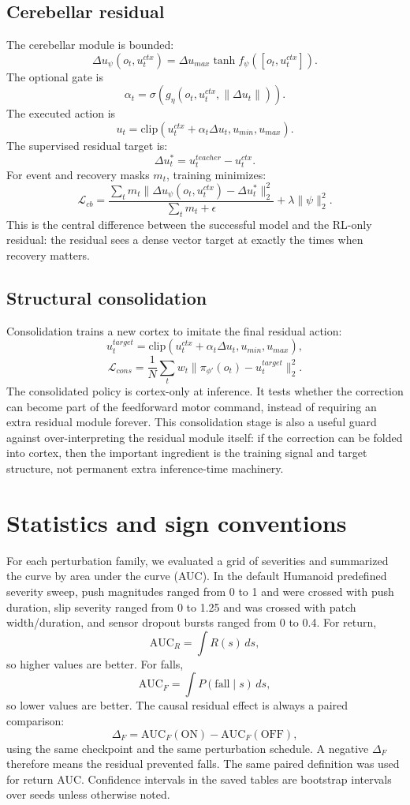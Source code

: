 \documentclass[11pt]{article}
\begin{document}
\subsection{Cerebellar residual}
The cerebellar module is bounded:
\[
\Delta u_\psi(o_t,u_t^{ctx}) =
\Delta u_{max} \tanh f_\psi([o_t,u_t^{ctx}]).
\]
The optional gate is
\[
\alpha_t = \sigma(g_\eta(o_t,u_t^{ctx},\|\Delta u_t\|)).
\]
The executed action is
\[
u_t = \mathrm{clip}(u_t^{ctx} + \alpha_t \Delta u_t, u_{min}, u_{max}).
\]
The supervised residual target is:
\[
\Delta u_t^* = u_t^{teacher} - u_t^{ctx}.
\]
For event and recovery masks $m_t$, training minimizes:
\[
\mathcal{L}_{cb} =
\frac{\sum_t m_t \|\Delta u_\psi(o_t,u_t^{ctx}) - \Delta u_t^*\|_2^2}
{\sum_t m_t + \epsilon} + \lambda \|\psi\|_2^2.
\]
This is the central difference between the successful model and the RL-only residual: the residual sees a dense vector target at exactly the times when recovery matters.

\subsection{Structural consolidation}
Consolidation trains a new cortex to imitate the final residual action:
\[
u_t^{target} = \mathrm{clip}(u_t^{ctx} + \alpha_t \Delta u_t, u_{min}, u_{max}),
\]
\[
\mathcal{L}_{cons} =
\frac{1}{N}\sum_t w_t \|\pi_{\phi'}(o_t) - u_t^{target}\|_2^2.
\]
The consolidated policy is cortex-only at inference.  It tests whether the correction can become part of the feedforward motor command, instead of requiring an extra residual module forever.  This consolidation stage is also a useful guard against over-interpreting the residual module itself: if the correction can be folded into cortex, then the important ingredient is the training signal and target structure, not permanent extra inference-time machinery.

\section{Statistics and sign conventions}
For each perturbation family, we evaluated a grid of severities and summarized the curve by area under the curve (AUC).  In the default Humanoid predefined severity sweep, push magnitudes ranged from 0 to 1 and were crossed with push duration, slip severity ranged from 0 to 1.25 and was crossed with patch width/duration, and sensor dropout bursts ranged from 0 to 0.4.  For return,
\[
\mathrm{AUC}_R = \int R(s)\,ds,
\]
so higher values are better.  For falls,
\[
\mathrm{AUC}_F = \int P(\mathrm{fall}\mid s)\,ds,
\]
so lower values are better.  The causal residual effect is always a paired comparison:
\[
\Delta_F = \mathrm{AUC}_F(\mathrm{ON}) - \mathrm{AUC}_F(\mathrm{OFF}),
\]
using the same checkpoint and the same perturbation schedule.  A negative $\Delta_F$ therefore means the residual prevented falls.  The same paired definition was used for return AUC.  Confidence intervals in the saved tables are bootstrap intervals over seeds unless otherwise noted.
\end{document}
